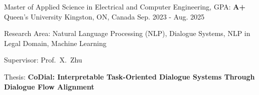 

\begin{cventries}

  \cventry
    {Master of Applied Science in Electrical and Computer Engineering, GPA: \textbf{A+}} %
    {Queen's University} %
    {Kingston, ON, Canada} %
    {Sep. 2023 - Aug. 2025} %
    {
      \begin{cvitems}
		\item{
          Research Area: Natural Language Processing (NLP), Dialogue Systems, NLP in Legal Domain, Machine Learning
        }
        \item{
          Supervisor: Prof.~X.~Zhu
        }
        \item{Thesis: \textbf{CoDial: Interpretable Task-Oriented Dialogue Systems Through Dialogue Flow Alignment}}
      \end{cvitems}
    }



\end{cventries}
